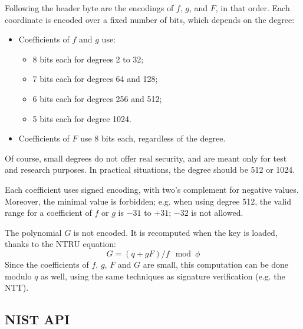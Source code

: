 Following the header byte are the encodings of $f$, $g$, and $F$,
in that order. Each coordinate is encoded over a fixed number of bits,
which depends on the degree:
\begin{itemize}

    \item Coefficients of $f$ and $g$ use:
    \begin{itemize}
        \item 8 bits each for degrees 2 to 32;
        \item 7 bits each for degrees 64 and 128;
        \item 6 bits each for degrees 256 and 512;
        \item 5 bits each for degree 1024.
    \end{itemize}

    \item Coefficients of $F$ use 8 bits each, regardless of the
    degree.

\end{itemize}
Of course, small degrees do not offer real security, and are meant only
for test and research purposes. In practical situations, the degree
should be 512 or 1024.

Each coefficient uses signed encoding, with two's complement for
negative values. Moreover, the minimal value is forbidden; e.g. when
using degree 512, the valid range for a coefficient of $f$ or $g$
is $-31$ to $+31$; $-32$ is not allowed.

The polynomial $G$ is not encoded. It is recomputed when the key is
loaded, thanks to the NTRU equation:
\begin{equation}
  G = (q + gF)/f \mod \phi
\end{equation}
Since the coefficients of $f$, $g$, $F$ and $G$ are small, this
computation can be done modulo $q$ as well, using the same techniques as
signature verification (e.g. the NTT).

\subsection{NIST API}

